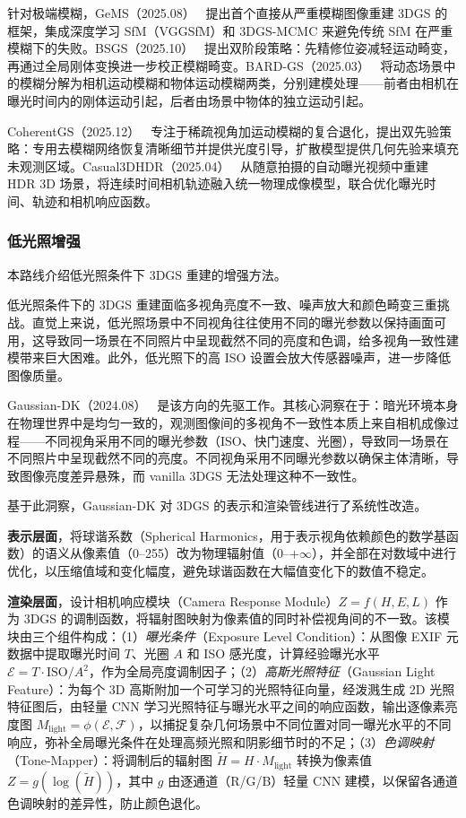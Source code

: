 针对极端模糊，GeMS（2025.08）~\cite{2508_14682} 提出首个直接从严重模糊图像重建 3DGS 的框架，集成深度学习 SfM（VGGSfM）和 3DGS-MCMC 来避免传统 SfM 在严重模糊下的失败。BSGS（2025.10）~\cite{2510_12493} 提出双阶段策略：先精修位姿减轻运动畸变，再通过全局刚体变换进一步校正模糊畸变。BARD-GS（2025.03）~\cite{2503_15835} 将动态场景中的模糊分解为相机运动模糊和物体运动模糊两类，分别建模处理——前者由相机在曝光时间内的刚体运动引起，后者由场景中物体的独立运动引起。

CoherentGS（2025.12）~\cite{2512_10369} 专注于稀疏视角加运动模糊的复合退化，提出双先验策略：专用去模糊网络恢复清晰细节并提供光度引导，扩散模型提供几何先验来填充未观测区域。Casual3DHDR（2025.04）~\cite{2504_17728} 从随意拍摄的自动曝光视频中重建 HDR 3D 场景，将连续时间相机轨迹融入统一物理成像模型，联合优化曝光时间、轨迹和相机响应函数。

\subsubsection{低光照增强}

本路线介绍低光照条件下 3DGS 重建的增强方法。

低光照条件下的 3DGS 重建面临多视角亮度不一致、噪声放大和颜色畸变三重挑战。直觉上来说，低光照场景中不同视角往往使用不同的曝光参数以保持画面可用，这导致同一场景在不同照片中呈现截然不同的亮度和色调，给多视角一致性建模带来巨大困难。此外，低光照下的高 ISO 设置会放大传感器噪声，进一步降低图像质量。

Gaussian-DK（2024.08）~\cite{2408_09130} 是该方向的先驱工作。其核心洞察在于：暗光环境本身在物理世界中是均匀一致的，观测图像间的多视角不一致性本质上来自相机成像过程——不同视角采用不同的曝光参数（ISO、快门速度、光圈），导致同一场景在不同照片中呈现截然不同的亮度。不同视角采用不同曝光参数以确保主体清晰，导致图像亮度差异悬殊，而 vanilla 3DGS 无法处理这种不一致性。

基于此洞察，Gaussian-DK 对 3DGS 的表示和渲染管线进行了系统性改造。

\textbf{表示层面}，将球谐系数（Spherical Harmonics，用于表示视角依赖颜色的数学基函数）的语义从像素值（0--255）改为物理辐射值（0--$+\infty$），并全部在对数域中进行优化，以压缩值域和变化幅度，避免球谐函数在大幅值变化下的数值不稳定。

\textbf{渲染层面}，设计相机响应模块（Camera Response Module）$Z = f(H, E, L)$ 作为 3DGS 的调制函数，将辐射图映射为像素值的同时补偿视角间的不一致。该模块由三个组件构成：（1）\emph{曝光条件}（Exposure Level Condition）：从图像 EXIF 元数据中提取曝光时间 $T$、光圈 $A$ 和 ISO 感光度，计算经验曝光水平 $\mathcal{E} = T \cdot \text{ISO} / A^2$，作为全局亮度调制因子；（2）\emph{高斯光照特征}（Gaussian Light Feature）：为每个 3D 高斯附加一个可学习的光照特征向量，经泼溅生成 2D 光照特征图后，由轻量 CNN 学习光照特征与曝光水平之间的响应函数，输出逐像素亮度图 $M_{\text{light}} = \phi(\mathcal{E}, \mathcal{F})$，以捕捉复杂几何场景中不同位置对同一曝光水平的不同响应，弥补全局曝光条件在处理高频光照和阴影细节时的不足；（3）\emph{色调映射}（Tone-Mapper）：将调制后的辐射图 $\tilde{H} = H \cdot M_{\text{light}}$ 转换为像素值 $Z = g(\log(\tilde{H}))$，其中 $g$ 由逐通道（R/G/B）轻量 CNN 建模，以保留各通道色调映射的差异性，防止颜色退化。

